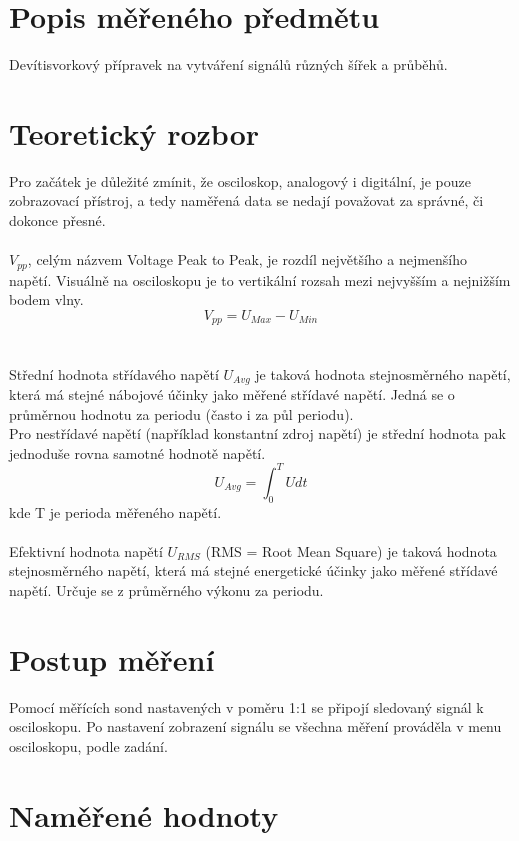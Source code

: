 
\section{Popis měřeného předmětu}
Devítisvorkový přípravek na vytváření signálů různých šířek a průběhů.

\section{Teoretický rozbor}
Pro začátek je důležité zmínit, že osciloskop, analogový i digitální, je pouze zobrazovací přístroj, a tedy \glqq{}naměřená\grqq{} data se nedají považovat za správné, či dokonce přesné.
\\\\
$V_{pp}$, celým názvem Voltage Peak to Peak, je rozdíl největšího a nejmenšího napětí. Visuálně na osciloskopu je to vertikální rozsah mezi nejvyšším a nejnižším bodem vlny.
\\
\[V_{pp} = U_{Max} - U_{Min} \]
\\\\
Střední hodnota střídavého napětí $U_{Avg}$ je taková hodnota stejnosměrného napětí, která má stejné nábojové účinky jako měřené střídavé napětí. Jedná se o průměrnou hodnotu za periodu (často i za půl periodu).
\\
Pro nestřídavé napětí (například konstantní zdroj napětí) je střední hodnota pak jednoduše rovna samotné hodnotě napětí.
\\
\[U_{Avg} = \int_0^T U dt \] kde T je perioda měřeného napětí.
\\\\
Efektivní hodnota napětí $U_{RMS}$ (RMS = Root Mean Square) je taková hodnota stejnosměrného napětí, která má stejné energetické účinky jako měřené střídavé napětí. Určuje se z průměrného výkonu za periodu.
\\


\section{Postup měření}
Pomocí měřících sond nastavených v poměru 1:1 se připojí sledovaný signál k osciloskopu. Po nastavení zobrazení signálu se všechna měření prováděla v menu osciloskopu, podle zadání.

\newpage
\section{Naměřené hodnoty}

